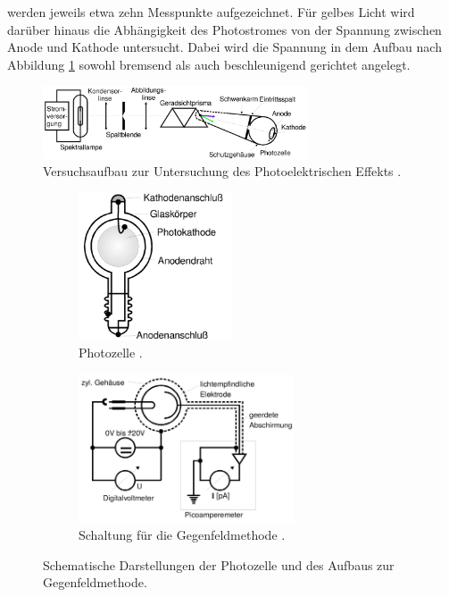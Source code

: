 werden jeweils etwa zehn Messpunkte aufgezeichnet. Für gelbes Licht wird darüber hinaus die Abhängigkeit des Photostromes
von der Spannung zwischen Anode und Kathode untersucht. Dabei wird die Spannung in dem Aufbau nach Abbildung \ref{fig: aufbau}
sowohl bremsend als auch beschleunigend gerichtet angelegt.
\begin{figure}
  \centering
  \includegraphics[width = 0.7\textwidth]{pics/aufbau.png}
  \caption{Versuchsaufbau zur Untersuchung des Photoelektrischen Effekts \cite{anleitung500}.}
  \label{fig: aufbau}
\end{figure}
\begin{figure}
  \centering
  \begin{subfigure}{0.48\textwidth}
    \centering
    \includegraphics[width = 0.5\textwidth]{pics/photozelle.png}
    \caption{Photozelle \cite{anleitung500}.}
    \label{fig: photozelle}
  \end{subfigure}
  \begin{subfigure}{0.48\textwidth}
    \centering
    \includegraphics[width = 0.7\textwidth]{pics/schaltplan.png}
    \caption{Schaltung für die Gegenfeldmethode \cite{anleitung500}.}
    \label{fig: schaltplan}
  \end{subfigure}
  \caption{Schematische Darstellungen der Photozelle und des Aufbaus zur Gegenfeldmethode.}
\end{figure}
